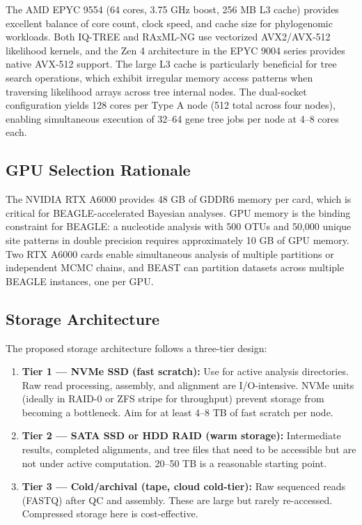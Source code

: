 The AMD EPYC 9554 (64 cores, 3.75 GHz boost, 256 MB L3 cache) provides excellent balance of core count, clock speed, and cache size for phylogenomic workloads. Both IQ-TREE and RAxML-NG use vectorized AVX2/AVX-512 likelihood kernels, and the Zen 4 architecture in the EPYC 9004 series provides native AVX-512 support. The large L3 cache is particularly beneficial for tree search operations, which exhibit irregular memory access patterns when traversing likelihood arrays across tree internal nodes. The dual-socket configuration yields 128 cores per Type A node (512 total across four nodes), enabling simultaneous execution of 32--64 gene tree jobs per node at 4--8 cores each.

\subsection{GPU Selection Rationale}

The NVIDIA RTX A6000 provides 48 GB of GDDR6 memory per card, which is critical for BEAGLE-accelerated Bayesian analyses. GPU memory is the binding constraint for BEAGLE: a nucleotide analysis with 500 OTUs and 50,000 unique site patterns in double precision requires approximately 10 GB of GPU memory. Two RTX A6000 cards enable simultaneous analysis of multiple partitions or independent MCMC chains, and BEAST can partition datasets across multiple BEAGLE instances, one per GPU.

\subsection{Storage Architecture}

The proposed storage architecture follows a three-tier design:

\begin{enumerate}
\item \textbf{Tier 1 --- NVMe SSD (fast scratch):} Use for active analysis directories. Raw read processing, assembly, and alignment are I/O-intensive. NVMe units (ideally in RAID-0 or ZFS stripe for throughput) prevent storage from becoming a bottleneck. Aim for at least 4--8 TB of fast scratch per node.

\item \textbf{Tier 2 --- SATA SSD or HDD RAID (warm storage):} Intermediate results, completed alignments, and tree files that need to be accessible but are not under active computation. 20--50 TB is a reasonable starting point.

\item \textbf{Tier 3 --- Cold/archival (tape, cloud cold-tier):} Raw sequenced reads (FASTQ) after QC and assembly. These are large but rarely re-accessed. Compressed storage here is cost-effective.
\end{enumerate}

